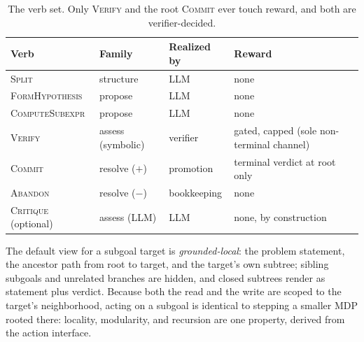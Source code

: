 \begin{table}[t]
\centering
\small
\begin{tabular}{@{}llll@{}}
\toprule
Verb & Family & Realized by & Reward \\
\midrule
\textsc{Split} & structure & LLM & none \\
\textsc{FormHypothesis} & propose & LLM & none \\
\textsc{ComputeSubexpr} & propose & LLM & none \\
\textsc{Verify} & assess (symbolic) & verifier & gated, capped (sole non-terminal channel) \\
\textsc{Commit} & resolve ($+$) & promotion & terminal verdict at root only \\
\textsc{Abandon} & resolve ($-$) & bookkeeping & none \\
\textsc{Critique} (optional) & assess (LLM) & LLM & none, by construction \\
\bottomrule
\end{tabular}
\caption{The verb set. Only \textsc{Verify} and the root \textsc{Commit}
ever touch reward, and both are verifier-decided.}
\label{tab:verbs}
\end{table}

The default view for a subgoal target is \emph{grounded-local}: the problem
statement, the ancestor path from root to target, and the target's own
subtree; sibling subgoals and unrelated branches are hidden, and closed
subtrees render as statement plus verdict. Because both the read and the
write are scoped to the target's neighborhood, acting on a subgoal is
identical to stepping a smaller MDP rooted there: locality, modularity, and
recursion are one property, derived from the action interface.

